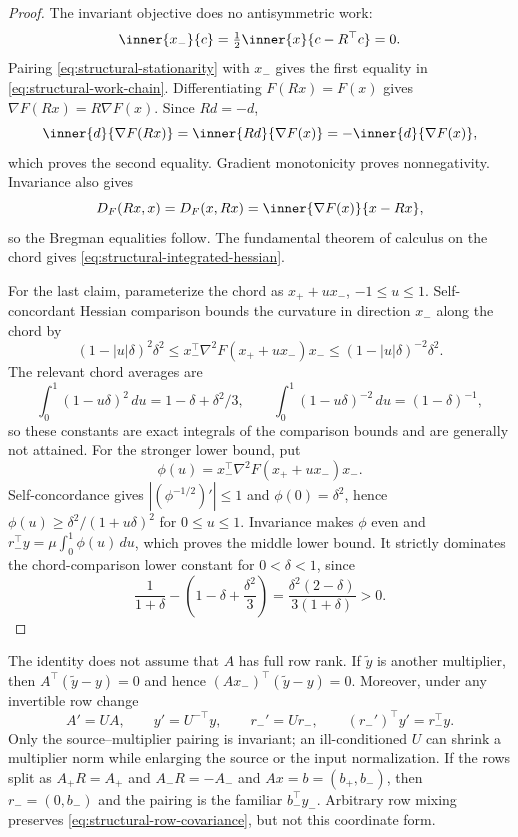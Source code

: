 \begin{proof}
The invariant objective does no antisymmetric work:
\[
 \inner{x_-}{c}=\tfrac12\inner{x}{c-R^\top c}=0.
\]
Pairing \eqref{eq:structural-stationarity} with $x_-$ gives the first
equality in \eqref{eq:structural-work-chain}.  Differentiating
$F(Rx)=F(x)$ gives $\nabla F(Rx)=R\nabla F(x)$.  Since $Rd=-d$,
\[
 \inner{d}{\nabla F(Rx)}
 =\inner{Rd}{\nabla F(x)}=-\inner{d}{\nabla F(x)},
\]
which proves the second equality.  Gradient monotonicity proves
nonnegativity.  Invariance also gives
\[
 D_F(Rx,x)=D_F(x,Rx)=\inner{\nabla F(x)}{x-Rx},
\]
so the Bregman equalities follow.  The fundamental theorem of calculus on
the chord gives \eqref{eq:structural-integrated-hessian}.

For the last claim, parameterize the chord as $x_++ux_-$,
$-1\leq u\leq1$.  Self-concordant Hessian comparison bounds the curvature in direction $x_-$
along the chord by
\[
 (1-|u|\delta)^2\delta^2
 \leq x_-^\top\nabla^2F(x_++ux_-)x_-
 \leq(1-|u|\delta)^{-2}\delta^2.
\]
The relevant chord averages are
\[
 \int_0^1(1-u\delta)^2\,du
 =1-\delta+\delta^2/3,
 \qquad
 \int_0^1(1-u\delta)^{-2}\,du=(1-\delta)^{-1},
\]
so these constants are exact integrals of the comparison bounds and are
generally not attained.  For the stronger lower bound, put
\[
 \phi(u)=x_-^\top\nabla^2F(x_++ux_-)x_-.
\]
Self-concordance gives
$|(\phi^{-1/2})'|\leq1$ and $\phi(0)=\delta^2$, hence
$\phi(u)\geq\delta^2/(1+u\delta)^2$ for $0\leq u\leq1$.
Invariance makes $\phi$ even and
$r_-^\top y=\mu\int_0^1\phi(u)\,du$, which proves the middle lower bound.
It strictly dominates the chord-comparison lower constant for
$0<\delta<1$, since
\[
 \frac1{1+\delta}-\left(1-\delta+\frac{\delta^2}{3}\right)
 =\frac{\delta^2(2-\delta)}{3(1+\delta)}>0.
\]
\end{proof}

The identity does not assume that $A$ has full row rank.  If $\widetilde y$ is another
multiplier, then $A^\top(\widetilde y-y)=0$ and hence
$(Ax_-)^\top(\widetilde y-y)=0$.  Moreover, under any invertible row change
\begin{equation}
 A'=UA,\qquad y'=U^{-\top}y,\qquad r_-'=Ur_-,
 \qquad (r_-')^\top y'=r_-^\top y.                              \label{eq:structural-row-covariance}
\end{equation}
Only the source--multiplier pairing is invariant; an ill-conditioned $U$
can shrink a multiplier norm while enlarging the source or the input
normalization.  If the rows split as $A_+R=A_+$ and $A_-R=-A_-$
and $Ax=b=(b_+,b_-)$, then $r_-=(0,b_-)$ and the pairing is the familiar
$b_-^\top y_-$.  Arbitrary row mixing preserves
\eqref{eq:structural-row-covariance}, but not this coordinate form.

